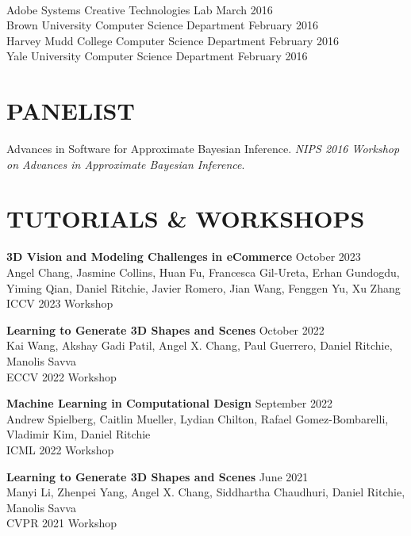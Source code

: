 \documentclass[line,margin]{res}
\begin{document}
\begin{resume}
\\
\talk
	{Adobe Systems}
	{Creative Technologies Lab}
	{March 2016}\\
\talk
	{Brown University}
	{Computer Science Department}
	{February 2016}\\
\talk
	{Harvey Mudd College}
	{Computer Science Department}
	{February 2016}\\
\talk
	{Yale University}
	{Computer Science Department}
	{February 2016}


\section{PANELIST}

\newcommand{\panelist}[2]{
	#1. \emph{#2}.
}

\panelist{Advances in Software for Approximate Bayesian Inference}{NIPS 2016 Workshop on Advances in Approximate Bayesian Inference}


\section{TUTORIALS \& WORKSHOPS}

\newcommand{\tutorial}[4] {
	\textbf{#1} \hfill #4\\
	#2\\
	#3
}
\newcommand{\workshop}[4] {
	\textbf{#1} \hfill #4\\
	#2\\
	#3
}

\workshop
{3D Vision and Modeling Challenges in eCommerce}
{Angel Chang, Jasmine Collins, Huan Fu, Francesca Gil-Ureta, Erhan Gundogdu, Yiming Qian, Daniel Ritchie, Javier Romero, Jian Wang, Fenggen Yu, Xu Zhang}
{ICCV 2023 Workshop}
{October 2023}

\workshop
{Learning to Generate 3D Shapes and Scenes}
{Kai Wang, Akshay Gadi Patil, Angel X. Chang, Paul Guerrero, Daniel Ritchie, Manolis Savva}
{ECCV 2022 Workshop}
{October 2022}

\workshop
{Machine Learning in Computational Design}
{Andrew Spielberg, Caitlin Mueller, Lydian Chilton, Rafael Gomez-Bombarelli, Vladimir Kim, Daniel Ritchie}
{ICML 2022 Workshop}
{September 2022}

\workshop
{Learning to Generate 3D Shapes and Scenes}
{Manyi Li, Zhenpei Yang, Angel X. Chang, Siddhartha Chaudhuri, Daniel Ritchie, Manolis Savva}
{CVPR 2021 Workshop}
{June 2021}


\end{resume}
\end{document}
